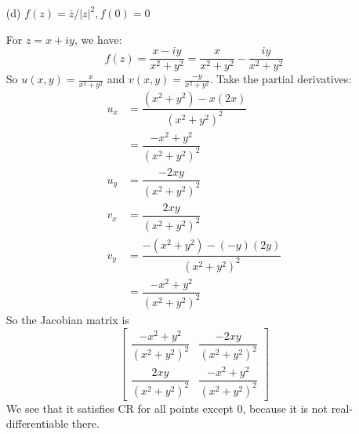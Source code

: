 \documentclass{article}
\begin{document}
\begin{itemize}
        \item [(d)] $f(z) = \overline{z}/\lvert z \rvert^{2}, f(0) = 0$ 
            \begin{answer}
                For $z = x + iy$, we have:
                    \begin{equation*}
                        f(z) = \dfrac{x - iy}{x^{2} + y^{2}} = \dfrac{x}{x^{2} + y^{2}} - \dfrac{iy}{x^{2} + y^{2}}
                    \end{equation*}
                So $u(x, y) = \frac{x}{x^{2} + y^{2}}$ and $v(x, y) = \frac{-y}{x^{2} + y^{2}}$. Take the partial derivatives:
                    \begin{align*}
                        u_{x} &= \dfrac{(x^{2} + y^{2}) - x(2x)}{(x^{2} + y^{2})^{2}}     \\
                              &= \dfrac{-x^{2} + y^{2}}{(x^{2} + y^{2})^{2}}              \\
                        u_{y} &= \dfrac{-2xy}{(x^{2} + y^{2})^{2}}                        \\
                        v_{x} &= \dfrac{2xy}{(x^{2} + y^{2})^{2}}                         \\
                        v_{y} &= \dfrac{-(x^{2} + y^{2}) - (-y)(2y)}{(x^{2} + y^{2})^{2}} \\
                              &= \dfrac{-x^{2} + y^{2}}{(x^{2} + y^{2})^{2}}                
                    \end{align*}
                So the Jacobian matrix is
                    \begin{equation*}
                        \begin{bmatrix}
                            \dfrac{-x^{2} + y^{2}}{(x^{2} + y^{2})^{2}} & \dfrac{-2xy}{(x^{2} + y^{2})^{2}}           \\
                            \dfrac{2xy}{(x^{2} + y^{2})^{2}}            & \dfrac{-x^{2} + y^{2}}{(x^{2} + y^{2})^{2}}   
                        \end{bmatrix}
                    \end{equation*}
                We see that it satisfies CR for all points except $0$, because it is not real-differentiable there.
            \end{answer}
    \end{itemize}
\end{document}
